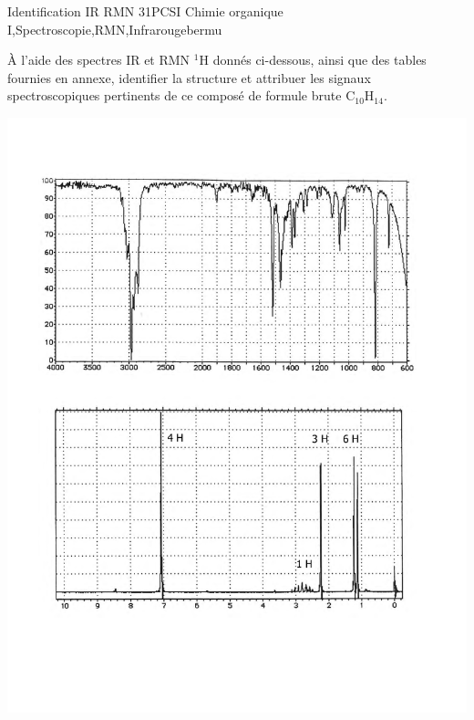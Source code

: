 \begin{exercise}{Identification IR RMN 3}{1}{PCSI}
{Chimie organique I,Spectroscopie,RMN,Infrarouge}{bermu}

À l'aide des spectres IR et RMN $^{1}$H donnés ci-dessous, ainsi que des tables fournies en annexe, identifier la structure et attribuer les signaux spectroscopiques pertinents de ce composé de formule brute $\mathrm{C_{10}H_{14}}$.
 
\vspace{2em}
 
\includegraphics[width=\linewidth]{chimiePC/orga/IR_RMN_3.pdf}

\end{exercise}

\begin{solution}
\begin{center}
\end{center}
\end{solution}

